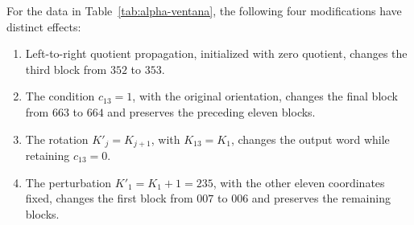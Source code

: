 \begin{proposition}
\label{mg05:dependencias}
For the data in Table~\ref{tab:alpha-ventana}, the following four
modifications have distinct effects:
\begin{enumerate}
\item Left-to-right quotient propagation, initialized with zero
quotient, changes the third block from \(352\) to \(353\).
\item The condition \(c_{13}=1\), with the original orientation,
changes the final block from \(663\) to \(664\) and preserves the
preceding eleven blocks.
\item The rotation \(K'_j=K_{j+1}\), with \(K_{13}=K_1\), changes
the output word while retaining \(c_{13}=0\).
\item The perturbation \(K'_1=K_1+1=235\), with the other eleven
coordinates fixed, changes the first block from \(007\) to \(006\)
and preserves the remaining blocks.
\end{enumerate}
\end{proposition}
